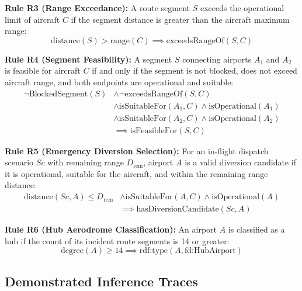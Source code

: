 \documentclass[conference]{IEEEtran}
\begin{document}
\textbf{Rule R3 (Range Exceedance):}
A route segment $S$ exceeds the operational limit of aircraft $C$ if the segment distance is greater than the aircraft maximum range:
\begin{equation}
    \text{distance}(S) > \text{range}(C) \implies \text{exceedsRangeOf}(S, C)
\end{equation}

\textbf{Rule R4 (Segment Feasibility):}
A segment $S$ connecting airports $A_1$ and $A_2$ is feasible for aircraft $C$ if and only if the segment is not blocked, does not exceed aircraft range, and both endpoints are operational and suitable:
\begin{align}
    \neg \text{BlockedSegment}(S) &\land \neg \text{exceedsRangeOf}(S, C) \nonumber \\
    &\land \text{isSuitableFor}(A_1, C) \land \text{isOperational}(A_1) \nonumber \\
    &\land \text{isSuitableFor}(A_2, C) \land \text{isOperational}(A_2) \nonumber \\
    &\implies \text{isFeasibleFor}(S, C)
\end{align}

\textbf{Rule R5 (Emergency Diversion Selection):}
For an in-flight dispatch scenario $Sc$ with remaining range $D_{\text{rem}}$, airport $A$ is a valid diversion candidate if it is operational, suitable for the aircraft, and within the remaining range distance:
\begin{align}
    \text{distance}(Sc, A) \le D_{\text{rem}} &\land \text{isSuitableFor}(A, C) \land \text{isOperational}(A) \nonumber \\
    &\implies \text{hasDiversionCandidate}(Sc, A)
\end{align}

\textbf{Rule R6 (Hub Aerodrome Classification):}
An airport $A$ is classified as a hub if the count of its incident route segments is 14 or greater:
\begin{equation}
    \text{degree}(A) \ge 14 \implies \text{rdf:type}(A, \text{fd:HubAirport})
\end{equation}

\subsection{Demonstrated Inference Traces}
\end{document}
